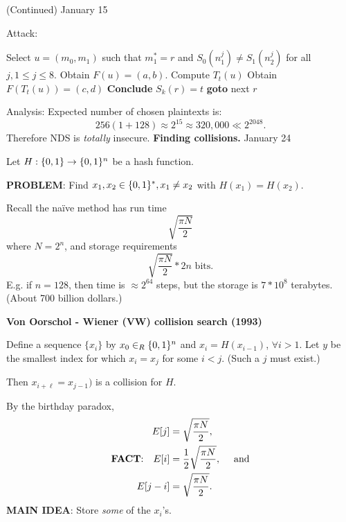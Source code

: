 \documentclass[a4paper,12pt]{article}
\def\LState{\State\unskip\the\therules}%
\begin{document}
\clearpage
{} (Continued) \hfill January 15


Attack:
\begin{algorithmic}
	\LState 
	Select $u = (m_0,m_1)$ such that $m_1^* = r$ and 
	$S_0(n_1^j) \ne S_1(n_2^j)$ for all $j, 1 \le j \le 8$.
	\LState
	Obtain $F(u) = (a,b)$.
		\LState
		Compute $T_t(u)$
		\LState
		Obtain $F(T_t(u)) = (c,d)$
			\LState
			{\bf Conclude} $S_k(r) = t$
			\LState
			{\bf goto} next $r$
		\EndIf
	\EndFor
\EndFor
\EndProcedure
\end{algorithmic}

Analysis: Expected number of chosen plaintexts is:
$$
256(1+128)\approx 2^{15} \approx 320,000 \ll 2^{2048}.
$$
Therefore NDS is {\it totally} insecure.
\clearpage
{\bf Finding collisions.} \hfill January 24

Let $H:\{0,1\}\to\{0,1\}^n$ be a hash function.

{\bf PROBLEM}: Find $x_1,x_2 \in \{0,1\}^*, x_1\ne x_2$ with $H(x_1)=H(x_2)$.

Recall the na\"ive method has run time
$$
\sqrt{\frac{\pi N}{2}}
$$
where $N=2^n$, and storage requirements
$$
\sqrt{\frac{\pi N}{2}}*2n \text{ bits.}
$$
E.g. if $n=128$, then time is $\approx 2^{64}$ steps, but the storage is $7*10^{8}$ terabytes. (About 700 billion dollars.)

{\bf Von Oorschol - Wiener (VW) collision search (1993)}

Define a sequence $\{x_i\}$ by $x_0 \in_R \{0,1\}^n$ and $x_i = H(x_{i-1})$,
$\forall i > 1$.  Let $y$ be the smallest index for which $x_i = x_j$ for some $i<j$.
(Such a $j$ must exist.)

Then $x_{i+\ell} = x_{j-1})$ is a collision for $H$.

By the birthday paradox,
\begin{align*}
E[j] &= \sqrt{\frac{\pi N}{2}},\\
\text{{\bf FACT}:}\quad E[i] &= \frac{1}{2}\sqrt{\frac{\pi N}{2}},\quad \text{ and}\\
E[j-i] &= \sqrt{\frac{\pi N}{2}}.
\end{align*}
{\bf MAIN IDEA}: Store {\it some} of the $x_i$'s.
\end{document}
